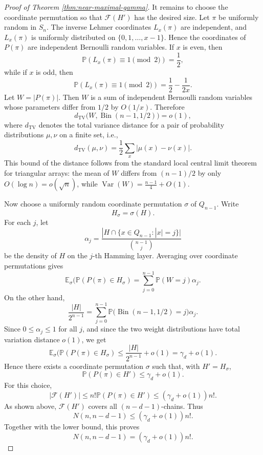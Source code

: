 \documentclass[11pt]{article}
\theoremstyle{definition}
\theoremstyle{remark}
\begin{document}
\begin{proof}[Proof of Theorem \ref{thm:near-maximal-gamma}]
It remains to choose the coordinate permutation so that $\mathcal F(H')$
has the desired size. Let $\pi$ be uniformly random in $S_n$. The
inverse Lehmer coordinates $L_x(\pi)$ are independent, and $L_x(\pi)$
is uniformly distributed on $\{0,1,\ldots,x-1\}$. Hence the coordinates
of $P(\pi)$ are independent Bernoulli random variables. If $x$ is
even, then
\[
\mathbb P(L_x(\pi)\equiv 1\pmod 2)=\frac12,
\]
while if $x$ is odd, then
\[
\mathbb P(L_x(\pi)\equiv 1\pmod 2)=
\frac12-\frac1{2x}.
\]
Let $W=|P(\pi)|$. Then $W$ is a sum of independent Bernoulli random
variables whose parameters differ from $1/2$ by $O(1/x)$. Therefore
\[
d_{\mathrm{TV}}\bigl(W,\operatorname{Bin}(n-1,1/2)\bigr)=o(1),
\] where $d_{\mathrm{TV}}$ denotes the total variance distance for a pair of probability distributions \(\mu,\nu\) on a finite set, i.e., 
\[
   d_{\mathrm{TV}}(\mu,\nu)
   =
   \frac12\sum_x |\mu(x)-\nu(x)|.
\]
This bound of the distance follows from the standard local central limit theorem
for triangular arrays: the mean of $W$ differs from $(n-1)/2$ by only
$O(\log n)=o(\sqrt n)$, while $\operatorname{Var}(W)=\frac{n-1}{4}+O(1)$.

Now choose a uniformly random coordinate permutation $\sigma$ of
$Q_{n-1}$. Write
\[
H_\sigma=\sigma(H).
\]
For each $j$, let
\[
\alpha_j=
\frac{|H\cap \{x\in Q_{n-1}: |x|=j\}|}{\binom{n-1}{j}}
\]
be the density of $H$ on the $j$-th Hamming layer. Averaging over
coordinate permutations gives
\[
\mathbb E_\sigma(
\mathbb P(P(\pi)\in H_\sigma)=
\sum_{j=0}^{n-1}\mathbb P(W=j)\alpha_j.
\]
On the other hand,
\[
\frac{|H|}{2^{n-1}}=
\sum_{j=0}^{n-1}
\mathbb P\bigl(\operatorname{Bin}(n-1,1/2)=j\bigr)\alpha_j.
\]
Since $0\le \alpha_j\le 1$ for all $j$, and since the two weight
distributions have total variation distance $o(1)$, we get
\[
\mathbb E_\sigma(
\mathbb P(P(\pi)\in H_\sigma)
\le
\frac{|H|}{2^{n-1}}+o(1)=
\gamma_d+o(1).
\]
Hence there exists a coordinate permutation $\sigma$ such that, with
$H'=H_\sigma$,
\[
\mathbb P(P(\pi)\in H')\le \gamma_d+o(1).
\]
For this choice,
\[
|\mathcal F(H')|\le 
n!\mathbb P(P(\pi)\in H')
\le
(\gamma_d+o(1))n!.
\]
As shown above, $\mathcal F(H')$ covers all $(n-d-1)$-chains. Thus
\[
N(n,n-d-1)\le(\gamma_d+o(1))n!.
\]
Together with the lower bound, this proves
\[
N(n,n-d-1)=(\gamma_d+o(1))n!.
\]
\end{proof}


\end{document}
